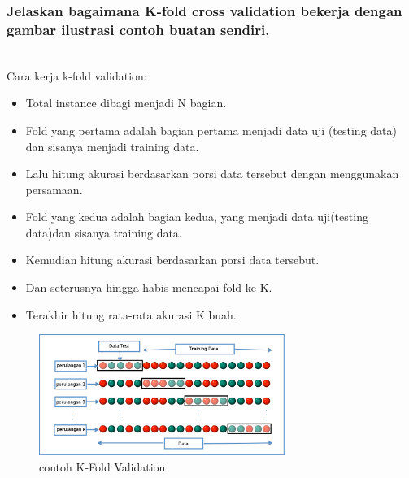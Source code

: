 \subsubsection{Jelaskan bagaimana K-fold cross validation bekerja dengan gambar ilustrasi contoh buatan sendiri.}
\hfill\\
Cara kerja k-fold validation:
\begin{itemize}
	\item Total instance dibagi menjadi N bagian.
	\item Fold yang pertama adalah bagian pertama menjadi data uji (testing data) dan sisanya menjadi training data.
	\item Lalu hitung akurasi berdasarkan porsi data tersebut dengan menggunakan persamaan.
	\item Fold yang kedua adalah bagian kedua, yang menjadi data uji(testing data)dan sisanya training  data.
	\item Kemudian hitung akurasi berdasarkan porsi data tersebut.
	\item Dan seterusnya hingga habis mencapai fold ke-K.
	\item Terakhir hitung rata-rata akurasi K buah.
\end{itemize}
\begin{figure}[H]
    \includegraphics[width=8cm]{figures/1174083/figures2/7.png}
    \centering
    \caption{contoh K-Fold Validation}
\end{figure}

